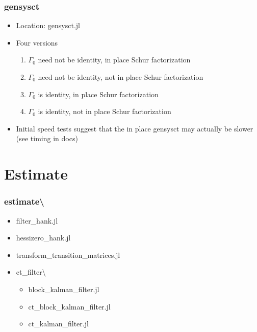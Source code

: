 \documentclass{beamer}
\begin{document}
\begin{frame}
  \frametitle{gensysct}
\begin{itemize}
\item Location: gensysct.jl
\item Four versions
  \begin{enumerate}
  \item $\Gamma_0$ need not be identity, in place Schur factorization
  \item $\Gamma_0$ need not be identity, not in place Schur factorization
  \item $\Gamma_0$ is identity, in place Schur factorization
  \item $\Gamma_0$ is identity, not in place Schur factorization
  \end{enumerate}
\item Initial speed tests suggest that the in place gensysct may actually be slower (see timing in docs)
\end{itemize}
\end{frame}

\section{Estimate}

\begin{frame}
\frametitle{estimate\textbackslash}
\begin{itemize}
  \item filter\_hank.jl
  \item hessizero\_hank.jl
  \item transform\_transition\_matrices.jl
  \item  ct\_filter\textbackslash
  \begin{itemize}
    \item block\_kalman\_filter.jl
    \item ct\_block\_kalman\_filter.jl
    \item ct\_kalman\_filter.jl
  \end{itemize}
\end{itemize}
\end{frame}
\end{document}
